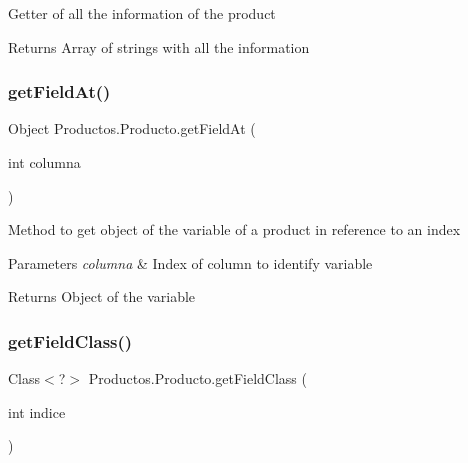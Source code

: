 Getter of all the information of the product

\begin{DoxyReturn}{Returns}
Array of strings with all the information 
\end{DoxyReturn}
\mbox{\label{class_productos_1_1_producto_a2a39275df7fbbf26f2173b760d0d4ba9}} 
\subsubsection{\texorpdfstring{get\+Field\+At()}{getFieldAt()}}
{\footnotesize\ttfamily Object Productos.\+Producto.\+get\+Field\+At (\begin{DoxyParamCaption}\item[{int}]{columna }\end{DoxyParamCaption})\hspace{0.3cm}{\ttfamily [inline]}}

Method to get object of the variable of a product in reference to an index


\begin{DoxyParams}{Parameters}
{\em columna} & Index of column to identify variable \\
\hline
\end{DoxyParams}
\begin{DoxyReturn}{Returns}
Object of the variable 
\end{DoxyReturn}
\mbox{\label{class_productos_1_1_producto_ae853d92d3cf87463dc31c6c9033e4f23}} 
\subsubsection{\texorpdfstring{get\+Field\+Class()}{getFieldClass()}}
{\footnotesize\ttfamily Class$<$?$>$ Productos.\+Producto.\+get\+Field\+Class (\begin{DoxyParamCaption}\item[{int}]{indice }\end{DoxyParamCaption})\hspace{0.3cm}{\ttfamily [inline]}}

